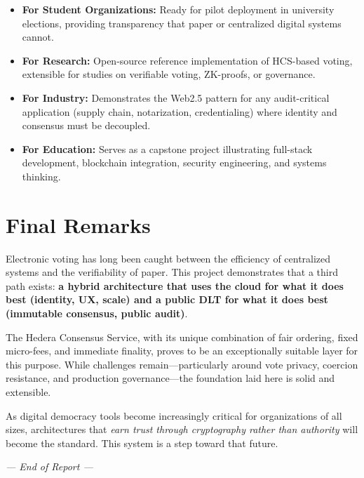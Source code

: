 \begin{itemize}
    \item \textbf{For Student Organizations:} Ready for pilot deployment in university
    elections, providing transparency that paper or centralized digital systems cannot.
    \item \textbf{For Research:} Open-source reference implementation of HCS-based
    voting, extensible for studies on verifiable voting, ZK-proofs, or governance.
    \item \textbf{For Industry:} Demonstrates the Web2.5 pattern for any audit-critical
    application (supply chain, notarization, credentialing) where identity and
    consensus must be decoupled.
    \item \textbf{For Education:} Serves as a capstone project illustrating
    full-stack development, blockchain integration, security engineering, and
    systems thinking.
\end{itemize}

\section{Final Remarks}
\label{sec:final}

Electronic voting has long been caught between the efficiency of centralized
systems and the verifiability of paper. This project demonstrates that a third
path exists: \textbf{a hybrid architecture that uses the cloud for what it does
best (identity, UX, scale) and a public DLT for what it does best (immutable
consensus, public audit)}.

The Hedera Consensus Service, with its unique combination of fair ordering,
fixed micro-fees, and immediate finality, proves to be an exceptionally suitable
layer for this purpose. While challenges remain---particularly around vote
privacy, coercion resistance, and production governance---the foundation laid
here is solid and extensible.

As digital democracy tools become increasingly critical for organizations of all
sizes, architectures that \textit{earn trust through cryptography rather than
authority} will become the standard. This system is a step toward that future.

\vspace{2cm}
\begin{flushright}
\textit{--- End of Report ---}
\end{flushright}
